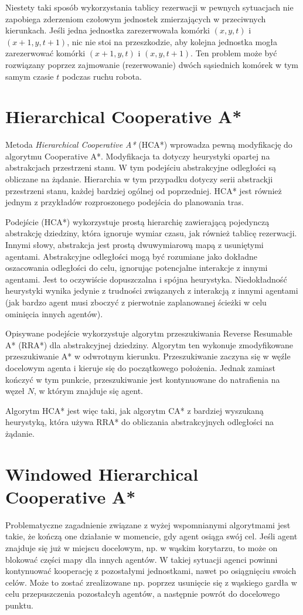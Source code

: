 Niestety taki sposób wykorzystania tablicy rezerwacji w pewnych sytuacjach nie zapobiega zderzeniom czołowym jednostek zmierzających w przeciwnych kierunkach.
Jeśli jedna jednostka zarezerwowała komórki $(x, y, t)$ i $(x + 1, y, t + 1)$, nic nie stoi na przeszkodzie, aby kolejna jednostka mogła zarezerwować komórki $(x + 1, y, t)$ i $(x, y, t + 1)$. Ten problem może być rozwiązany poprzez zajmowanie (rezerwowanie) dwóch sąsiednich komórek w tym samym czasie $t$ podczas ruchu robota.

\section{Hierarchical Cooperative A*}
\label{ch:hier_cooperative_a}
Metoda {\it Hierarchical Cooperative A*} (HCA*) wprowadza pewną modyfikację do algorytmu Cooperative A*. Modyfikacja ta dotyczy heurystyki opartej na abstrakcjach przestrzeni stanu. W tym podejściu abstrakcyjne odległości są obliczane na żądanie. Hierarchia w tym przypadku dotyczy serii abstrackji przestrzeni stanu, każdej bardziej ogólnej od poprzedniej. \cite{cooppath}
HCA* jest również jednym z przykładów rozproszonego podejścia do planowania tras.

Podejście (HCA*) wykorzystuje prostą hierarchię zawierającą pojedynczą abstrakcję dziedziny, która ignoruje wymiar czasu, jak również tablicę rezerwacji.
Innymi słowy, abstrakcja jest prostą dwuwymiarową mapą z usuniętymi agentami. Abstrakcyjne odległości mogą być rozumiane jako dokładne oszacowania odległości do celu, ignorując potencjalne interakcje z innymi agentami. Jest to oczywiście dopuszczalna i spójna heurystyka. Niedokładność heurystyki wynika jedynie z trudności związanych z interakcją z innymi agentami (jak bardzo agent musi zboczyć z pierwotnie zaplanowanej ścieżki w celu ominięcia innych agentów).

Opisywane podejście wykorzystuje algorytm przeszukiwania Reverse Resumable A* (RRA*) dla abstrakcyjnej dziedziny.
Algorytm ten wykonuje zmodyfikowane przeszukiwanie A* w odwrotnym kierunku. Przeszukiwanie zaczyna się w węźle docelowym agenta i kieruje się do początkowego położenia. Jednak zamiast kończyć w tym punkcie, przeszukiwanie jest kontynuowane do natrafienia na węzeł $N$, w którym znajduje się agent.

Algorytm HCA* jest więc taki, jak algorytm CA* z bardziej wyszukaną heurystyką, która używa RRA* do obliczania abstrakcyjnych odległości na żądanie.

\section{Windowed Hierarchical Cooperative A*}
\label{ch:whca}
Problematyczne zagadnienie związane z wyżej wspomnianymi algorytmami jest takie, że kończą one działanie w momencie, gdy agent osiąga swój cel. Jeśli agent znajduje się już w miejscu docelowym, np. w wąskim korytarzu, to może on blokować części mapy dla innych agentów. W takiej sytuacji agenci powinni kontynuować kooperację z pozostałymi jednostkami, nawet po osiągnięciu swoich celów. Może to zostać zrealizowane np. poprzez usunięcie się z wąskiego gardła w celu przepuszczenia pozostałcyh agentów, a następnie powrót do docelowego punktu. \cite{cooppath}

